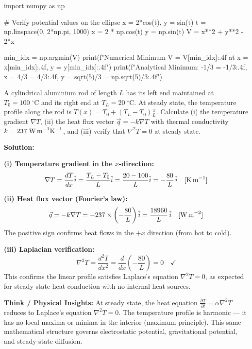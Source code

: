 \begin{pythonbox}
import numpy as np

# Verify potential values on the ellipse x = 2*cos(t), y = sin(t)
t = np.linspace(0, 2*np.pi, 1000)
x = 2 * np.cos(t)
y = np.sin(t)
V = x**2 + y**2 - 2*x

min_idx = np.argmin(V)
print(f"Numerical Minimum V = {V[min_idx]:.4f} at x = {x[min_idx]:.4f}, y = {y[min_idx]:.4f}")
print(f"Analytical Minimum: -1/3 = {-1/3:.4f}, x = 4/3 = {4/3:.4f}, y = sqrt(5)/3 = {np.sqrt(5)/3:.4f}")
\end{pythonbox}

\begin{psctexample}
A cylindrical aluminium rod of length $L$ has its left end maintained at $T_0 = 100\;^\circ\text{C}$ and its right end at $T_L = 20\;^\circ\text{C}$. At steady state, the temperature profile along the rod is $T(x) = T_0 + (T_L - T_0)\frac{x}{L}$. Calculate (i) the temperature gradient $\nabla T$, (ii) the heat flux vector $\vec{q} = -k\nabla T$ with thermal conductivity $k = 237\;\text{W\,m}^{-1}\text{K}^{-1}$, and (iii) verify that $\nabla^2 T = 0$ at steady state.

\textbf{Solution:}

\textbf{(i) Temperature gradient in the $x$-direction:}
\begin{equation}
\nabla T = \frac{dT}{dx}\hat{i} = \frac{T_L - T_0}{L}\hat{i} = \frac{20 - 100}{L}\hat{i} = -\frac{80}{L}\,\hat{i}\quad [\text{K\,m}^{-1}]
\end{equation}

\textbf{(ii) Heat flux vector (Fourier's law):}
\begin{equation}
\vec{q} = -k\nabla T = -237 \times \left(-\frac{80}{L}\right)\hat{i} = \frac{18960}{L}\,\hat{i}\quad [\text{W\,m}^{-2}]
\end{equation}
The positive sign confirms heat flows in the $+x$ direction (from hot to cold).

\textbf{(iii) Laplacian verification:}
\begin{equation}
\nabla^2 T = \frac{d^2T}{dx^2} = \frac{d}{dx}\!\left(-\frac{80}{L}\right) = 0 \quad \checkmark
\end{equation}
This confirms the linear profile satisfies Laplace's equation $\nabla^2 T = 0$, as expected for steady-state heat conduction with no internal heat sources.

\textbf{\color{rbruNavy}Think / Physical Insights:}
At steady state, the heat equation $\frac{\partial T}{\partial t} = \alpha \nabla^2 T$ reduces to Laplace's equation $\nabla^2 T = 0$. The temperature profile is harmonic — it has no local maxima or minima in the interior (maximum principle). This same mathematical structure governs electrostatic potential, gravitational potential, and steady-state diffusion.
\qedexam
\end{psctexample}

